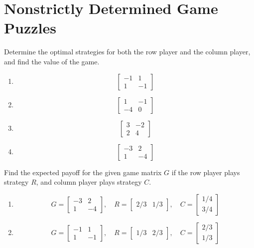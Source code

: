 \section{Nonstrictly Determined Game Puzzles}

\begin{puzzle}
    Determine the optimal strategies for both the row player and the column player, and find the value of the game.

    \begin{enumerate}
        \item \[\begin{bmatrix} -1 & 1 \\ 1 & -1 \end{bmatrix}\]
        \item \[\begin{bmatrix} 1 & -1 \\ -4 & 0 \end{bmatrix}\]
        \item \[\begin{bmatrix} 3 & -2 \\ 2 & 4 \end{bmatrix}\]
        \item \[\begin{bmatrix} -3 & 2 \\ 1 & -4 \end{bmatrix}\]
    \end{enumerate}
\end{puzzle}

\begin{puzzle}
    Find the expected payoff for the given game matrix $G$ if the row player plays strategy $R$, and column player plays strategy $C$.
    \begin{enumerate}
        \item \[G = \begin{bmatrix} -3 & 2 \\ 1 & -4 \end{bmatrix}, \quad R = \begin{bmatrix} 2/3 & 1/3 \end{bmatrix}, \quad C = \begin{bmatrix} 1/4 \\ 3/4 \end{bmatrix}\]
        \item \[G = \begin{bmatrix} -1 & 1 \\ 1 & -1 \end{bmatrix}, \quad R = \begin{bmatrix} 1/3 & 2/3 \end{bmatrix}, \quad C = \begin{bmatrix} 2/3 \\ 1/3 \end{bmatrix}\]
    \end{enumerate}

\end{puzzle}

